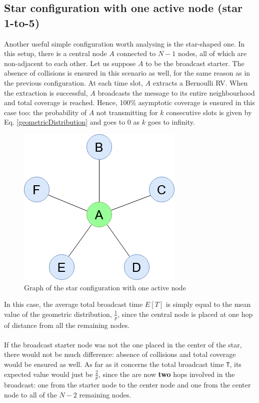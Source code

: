 \subsection{Star configuration with one active node (star 1-to-5)}
\label{ssec:star1}
Another useful simple configuration worth analysing is the star-shaped one. In
this setup, there is a central node $A$ connected to $N - 1$ nodes, all of which
are non-adjacent to each other. Let us suppose $A$ to be the broadcast starter.
The absence of collisions is ensured in this scenario as well, for the
same reason as in the previous configuration.
At each time slot, $A$ extracts a Bernoulli RV. When the extraction is
successful, $A$ broadcasts the message to its entire neighbourhood and total
coverage is reached. Hence, 100\% asymptotic coverage is ensured in this case
too: the probability of $A$ not transmitting for $k$ consecutive slots is
given by Eq. \ref{geometricDistribution} and goes to $0$ as $k$ goes to
infinity.
\begin{figure}[H]
    \begin{center}
        \includegraphics[scale=0.4]{img/star_graph.png}
        \caption{Graph of the star configuration with one active node}
        \label{fig:star1to5}
    \end{center}
\end{figure}
\noindent
In this case, the average total broadcast time $E[T]$ is simply equal to the
mean value of the geometric distribution, $\frac{1}{p}$, since the central
node is placed at one hop of distance from all the remaining nodes.\\
\\
If the broadcast starter node was not the one placed in the center of the star,
there would not be much difference: absence of collisions and total coverage
would be ensured as well. As far as it concerns the total broadcast time
\texttt{T}, its expected value would just be $\frac{2}{p}$, since
the are now \textbf{two} hops involved in the broadcast: one from the starter
node to the center node and one from the center node to all of the $N - 2$
remaining nodes.
